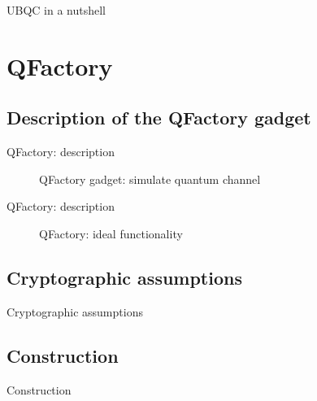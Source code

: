 \documentclass[]{beamer}
\begin{document}
\begin{frame}{UBQC in a nutshell}
  \begin{figure}[ht]
    \centering
  \end{figure}
\end{frame}

\section{QFactory}

\subsection{Description of the QFactory gadget}

\begin{frame}{QFactory: description}
  \begin{figure}[ht]
    \centering
    \caption{QFactory gadget: simulate quantum channel}
  \end{figure}
\end{frame}


\begin{frame}{QFactory: description}
  \begin{figure}[ht]
    \centering
    \caption{QFactory: ideal functionality}
  \end{figure}
\end{frame}

\subsection{Cryptographic assumptions}

\begin{frame}{Cryptographic assumptions}
  \begin{figure}[ht]
    \centering
  \end{figure}
\end{frame}

\subsection{Construction}

\begin{frame}[t]{Construction}
  \begin{figure}[ht]
    \centering
  \end{figure}
\end{frame}
\end{document}
